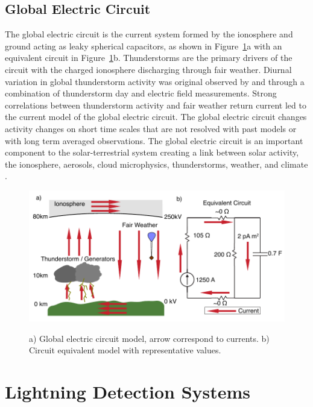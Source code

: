 \subsection{Global Electric Circuit}

The global electric circuit is the current system formed by the ionosphere and ground acting as leaky spherical capacitors, as shown in Figure~\ref{intro:fig:gec}a with an equivalent circuit in Figure~\ref{intro:fig:gec}b.
Thunderstorms are the primary drivers of the circuit with the charged ionosphere discharging through fair weather.
Diurnal variation in global thunderstorm activity was original observed by \citet{Wilson1921} and \citet{Whipple1929} through a combination of thunderstorm day and electric field measurements.
Strong correlations between thunderstorm activity and fair weather return current led to the current model of the global electric circuit.
The global electric circuit changes activity changes on short time scales that are not resolved with past models or with long term averaged observations.
The global electric circuit is an important component to the solar-terrestrial system creating a link between solar activity, the ionosphere, aerosols, cloud microphysics, thunderstorms, weather, and climate \citep{Tinsley2007, Holzworth1986}.

\begin{figure}[ht!]
	\centering
	\includegraphics[scale=1]{Introduction/Figures/global_circuit.pdf}\\
	\caption{a) Global electric circuit model, arrow correspond to currents.
			b) Circuit equivalent model with representative values.}
	\label{intro:fig:gec}
\end{figure}

\section{Lightning Detection Systems}

